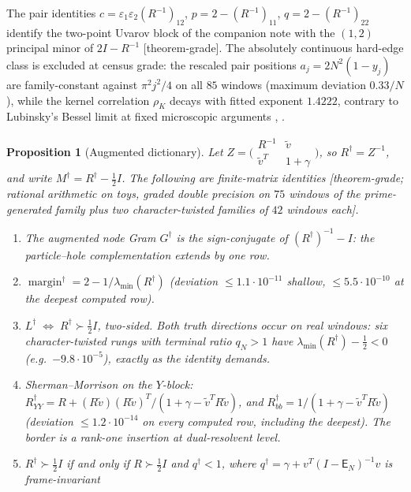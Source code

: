 \documentclass[11pt]{article}
\newtheorem{prop}{Proposition}
\theoremstyle{remark}
\newcommand{\E}{\mathsf{E}}
\newcommand{\Rd}{R^{\dagger}}
\newcommand{\Ld}{L^{\dagger}}
\newcommand{\half}{\tfrac12}
\newcommand{\gr}[1]{\textnormal{\small[#1]}}
\begin{document}
The pair identities $c=\varepsilon_{1}\varepsilon_{2}(R^{-1})_{12}$,
$p=2-(R^{-1})_{11}$, $q=2-(R^{-1})_{22}$ identify the two-point
Uvarov block of the companion note with the $(1,2)$ principal minor
of $2I-R^{-1}$ \gr{theorem-grade}.  The absolutely continuous
hard-edge class is excluded at census grade: the rescaled pair
positions $a_{j}=2N^{2}(1-y_{j})$ are family-constant against
$\pi^{2}j^{2}/4$ on all $85$ windows (maximum deviation
$0.33/N$), while the kernel correlation $\rho_{K}$ decays with
fitted exponent $1.4222$, contrary to Lubinsky's Bessel limit at
fixed microscopic arguments \cite{Lubinsky2008},
\cite[\S{}frozen-placement]{lstar-note}.

\begin{prop}[Augmented dictionary]\label{prop:A}
Let
$Z=\bigl(\begin{smallmatrix}R^{-1}&\widetilde v\\
\widetilde v^{T}&1+\gamma\end{smallmatrix}\bigr)$,
so $\Rd=Z^{-1}$, and write $M^{\dagger}=\Rd-\half I$.  The following
are finite-matrix identities \gr{theorem-grade; rational arithmetic
on toys, graded double precision on $75$ windows of the prime-generated
family plus two character-twisted families of $42$ windows each}.
\begin{enumerate}
\item[\textup{(A1)}]
The augmented node Gram $G^{\dagger}$ is the sign-conjugate of
$(\Rd)^{-1}-I$: the particle--hole complementation extends by one
row.
\item[\textup{(A2)}]
$\operatorname{margin}^{\dagger}=2-1/\lambda_{\min}(\Rd)$
(deviation $\le 1.1\cdot10^{-11}$ shallow,
$\le 5.5\cdot10^{-10}$ at the deepest computed row).
\item[\textup{(A3)}]
$\Ld\;\iff\;\Rd\succ\half I$, two-sided.  Both truth directions
occur on real windows: six character-twisted rungs with terminal
ratio $q_{N}>1$ have $\lambda_{\min}(\Rd)-\half<0$ (e.g.\ $-9.8\cdot
10^{-5}$), exactly as the identity demands.
\item[\textup{(A4)}]
Sherman--Morrison on the $Y$-block:
$\Rd_{YY}=R+(R\widetilde v)(R\widetilde v)^{T}/
(1+\gamma-\widetilde v^{T}R\widetilde v)$,
and $\Rd_{bb}=1/(1+\gamma-\widetilde v^{T}R\widetilde v)$
(deviation $\le 1.2\cdot10^{-14}$ on every computed row, including
the deepest).  The border is a rank-one insertion at dual-resolvent
level.
\item[\textup{(A5)}]
$\Rd\succ\half I$ if and only if $R\succ\half I$ and $q^{\dagger}<1$,
where $q^{\dagger}=\gamma+v^{T}(I-\E_{N})^{-1}v$ is frame-invariant

\end{enumerate}
\end{prop}
\end{document}
